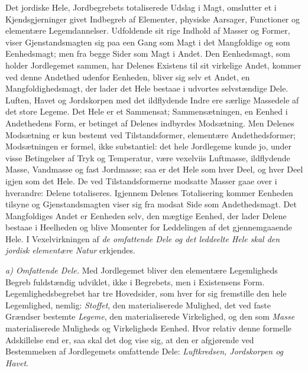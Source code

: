 \documentclass[12pt,a4paper]{book}
\newcommand{\runin}[1]{\emph{#1}\hspace{0.4em}}
\begin{document}
Det jordiske Hele, Jordbegrebets totaliserede Udslag i Magt, omslutter et
i Kjendsgjerninger givet Indbegreb af Elementer, physiske Aarsager,
Functioner og elementære Legemdannelser. Udfoldende sit rige Indhold af
Masser og Former, viser Gjenstandsmagten sig paa een Gang som Magt i det
Mangfoldige og som Eenhedsmagt; men fra begge Sider som Magt i Andet.
Den Eenhedsmagt, som holder Jordlegemet sammen, har Delenes Existens til
sit virkelige Andet, kommer ved denne Andethed udenfor Eenheden, bliver
sig selv et Andet, en Mangfoldighedsmagt, der lader det Hele bestaae i
udvortes selvstændige Dele. Luften, Havet og Jordskorpen med det
ildflydende Indre ere særlige Massedele af det store Legeme. Det Hele er
et Sammensat; Sammensætningen, en Eenhed i Andethedens Form, er betinget
af Delenes indbyrdes Modsætning. Men Delenes Modsætning er kun bestemt
ved Tilstandsformer, elementære Andethedsformer; Modsætningen er formel,
ikke substantiel: det hele Jordlegeme kunde jo, under visse Betingelser
af Tryk og Temperatur, være vexelviis Luftmasse, ildflydende Masse,
Vandmasse og fast Jordmasse; saa er det Hele som hver Deel, og hver Deel
igjen som det Hele. De ved Tilstandsformerne modsatte Masser gaae over i
hverandre: Delene totaliseres. Igjennem Delenes Totalisering kommer
Eenheden tilsyne og Gjenstandsmagten viser sig fra modsat Side som
Andethedsmagt. Det Mangfoldiges Andet er Eenheden selv, den mægtige
Eenhed, der lader Delene bestaae i Heelheden og blive Momenter for
Leddelingen af
det gjennemgaaende Hele. I Vexelvirkningen af \emph{de omfattende Dele og
det leddeelte Hele skal den jordisk elementære Natur} erkjendes.

\runin{a) Omfattende Dele.} Med Jordlegemet bliver den elementære
Legemligheds Begreb fuldstændig udviklet, ikke i Begrebets, men i
Existensens Form. Legemlighedsbegrebet har tre Hovedsider, som hver for
sig fremstille den hele Legemlighed, nemlig: \emph{Stoffet}, den
materialiserede Mulighed, det ved faste Grændser bestemte \emph{Legeme},
den materialiserede Virkelighed, og den som \emph{Masse} materialiserede
Muligheds og Virkeligheds Eenhed. Hvor relativ denne formelle Adskillelse
end er, saa skal det dog vise sig, at den er afgjørende ved Bestemmelsen
af Jordlegemets omfattende Dele: \emph{Luftkredsen, Jordskorpen og
Havet}.
\end{document}
